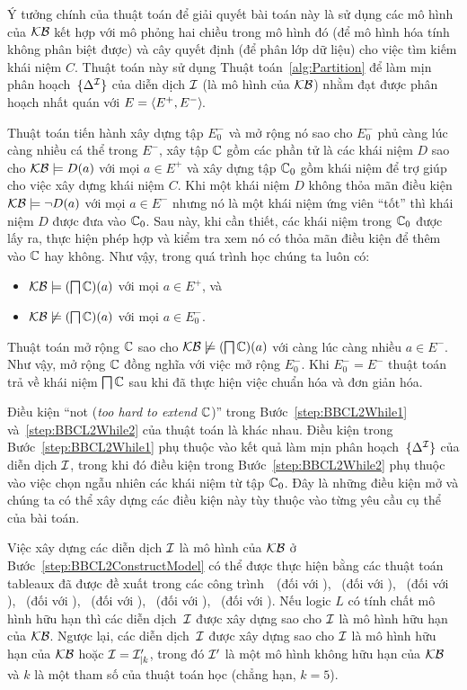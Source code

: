 Ý tưởng chính của thuật toán \BBCLearnS để giải quyết bài toán này là sử dụng các mô hình của $\mathcal{KB}$ kết hợp với mô phỏng hai chiều trong mô hình đó (để mô hình hóa tính không phân biệt được) và cây quyết định (để phân lớp dữ liệu) cho việc tìm kiếm khái niệm $C$. Thuật toán này sử dụng Thuật toán~\ref{alg:Partition} để làm mịn phân hoạch~$\{\Delta^{\mathcal{I}}\}$ của diễn dịch $\mathcal{I}$ (là mô hình của $\mathcal{KB}$) nhằm đạt được phân hoạch nhất quán với $E = \left\langle E^+, E^-\right\rangle\!$.

Thuật toán tiến hành xây dựng tập $E^-_0$ và mở rộng nó sao cho $E^-_0$ phủ càng lúc càng nhiều cá thể trong $E^-$, xây tập $\mathbb{C}$ gồm các phần tử là các khái niệm $D$ sao cho $\mathcal{KB} \models D(a)$ với mọi $a \in E^+$ và xây dựng tập $\mathbb{C}_0$ gồm khái niệm để trợ giúp cho việc xây dựng khái niệm $C$. 
Khi một khái niệm $D$ không thỏa mãn điều kiện $\mathcal{KB} \models \neg D(a)$ với mọi $a \in E^-$ nhưng nó là một khái niệm ứng viên ``tốt'' thì khái niệm $D$ được đưa vào $\mathbb{C}_0$. Sau này, khi cần thiết, các khái niệm trong $\mathbb{C}_0$ được lấy ra, thực hiện phép hợp và kiểm tra xem nó có thỏa mãn điều kiện để thêm vào $\mathbb{C}$ hay không. Như vậy, trong quá trình học chúng ta luôn có:
\begin{itemize}
	\item $\mathcal{KB} \models (\bigsqcap\mathbb{C})(a)$ với mọi $a \in E^+$, và
	\item $\mathcal{KB} \not\models (\bigsqcap\mathbb{C})(a)$ với mọi $a \in E^-_0$. 
\end{itemize}

Thuật toán mở rộng $\mathbb{C}$ sao cho $\mathcal{KB} \not\models(\bigsqcap\mathbb{C})(a)$ với càng lúc càng nhiều $a \in E^-$. Như vậy, mở rộng $\mathbb{C}$ đồng nghĩa với việc mở rộng $E^-_0$. Khi $E^-_0 = E^-$ thuật toán trả về khái niệm $\bigsqcap\mathbb{C}$ sau khi đã thực hiện việc chuẩn hóa và đơn giản hóa.

Điều kiện ``not (\textit{too hard to extend} $\mathbb{C}$)'' trong Bước~\ref{step:BBCL2While1} và~\ref{step:BBCL2While2} của thuật toán \BBCLearnS là khác nhau. Điều kiện trong Bước~\ref{step:BBCL2While1} phụ thuộc vào kết quả làm mịn phân hoạch~$\{\Delta^{\mathcal{I}}\}$ của diễn dịch $\mathcal{I}$, trong khi đó điều kiện trong Bước~\ref{step:BBCL2While2} phụ thuộc vào việc chọn ngẫu nhiên các khái niệm từ tập $\mathbb{C}_0$. Đây là những điều kiện mở và chúng ta có thể xây dựng các điều kiện này tùy thuộc vào từng yêu cầu cụ thể của bài toán.

Việc xây dựng các diễn dịch $\mathcal{I}$ là mô hình của $\mathcal{KB}$ ở Bước~\ref{step:BBCL2ConstructModel} có thể được thực hiện bằng các thuật toán tableaux đã được đề xuất trong các công trình~\cite{Nguyen2009}~(đối với \ALC), \cite{Nguyen2011B}~(đối với \ALCI), \cite{Nguyen2010}~(đối với \SH), \cite{Horrocks1999,Nguyen2011C}~(đối với \SHI), \cite{Horrocks2000B}~(đối với \SHIQ), \cite{Horrocks2007B}~(đối với \SHOIQ), \cite{Horrocks2006}~(đối với \SROIQ). Nếu logic $L$ có tính chất mô hình hữu hạn thì các diễn dịch~$\mathcal{I}$ được xây dựng sao cho $\mathcal{I}$ là mô hình hữu hạn của $\mathcal{KB}$. Ngược lại, các diễn dịch~$\mathcal{I}$ được xây dựng sao cho $\mathcal{I}$ là mô hình hữu hạn của $\mathcal{KB}$ hoặc $\mathcal{I} = \mathcal{I}'_{\mid k}$, trong đó $\mathcal{I}'$ là một mô hình không hữu hạn của $\mathcal{KB}$ và $k$ là một tham số của thuật toán học (chẳng hạn, $k = 5$).

